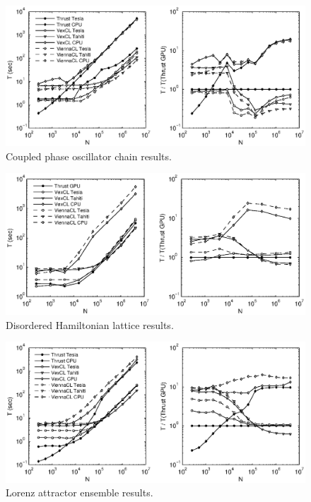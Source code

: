 \documentclass[final]{siamltex}
\begin{document}
\begin{figure}
    \begin{center}
        \includegraphics[width=\textwidth]{data/phase_oscillator_chain/perfcmp}
    \end{center}
    \caption{Coupled phase oscillator chain results.}
    \label{fig:phase:perf}
\end{figure}

\begin{figure}
    \begin{center}
        \includegraphics[width=\textwidth]{data/disordered_ham_lattice/perfcmp}
    \end{center}
    \caption{Disordered Hamiltonian lattice results.}
    \label{fig:lattice:perf}
\end{figure}

\begin{figure}
    \begin{center}
        \includegraphics[width=\textwidth]{data/lorenz_ensemble/perfcmp}
    \end{center}
    \caption{Lorenz attractor ensemble results.}
    \label{fig:lorenz:perf}
\end{figure}
\end{document}
